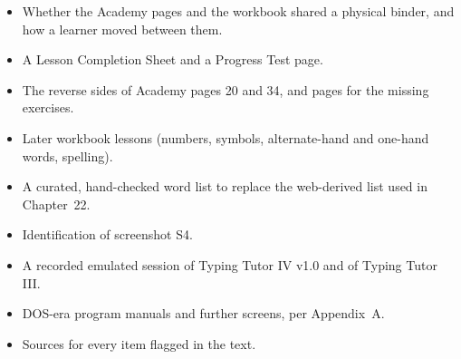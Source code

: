 \begin{itemize}
\item Whether the Academy pages and the workbook shared a physical binder, and how a learner moved between them.
\item A Lesson Completion Sheet and a Progress Test page.
\item The reverse sides of Academy pages 20 and 34, and pages for the missing exercises.
\item Later workbook lessons (numbers, symbols, alternate-hand and one-hand words, spelling).
\item A curated, hand-checked word list to replace the web-derived list used in Chapter~22.
\item Identification of screenshot S4.
\item A recorded emulated session of Typing Tutor IV v1.0 and of Typing Tutor III.
\item DOS-era program manuals and further screens, per Appendix~A.
\item Sources for every item flagged in the text.
\end{itemize}


